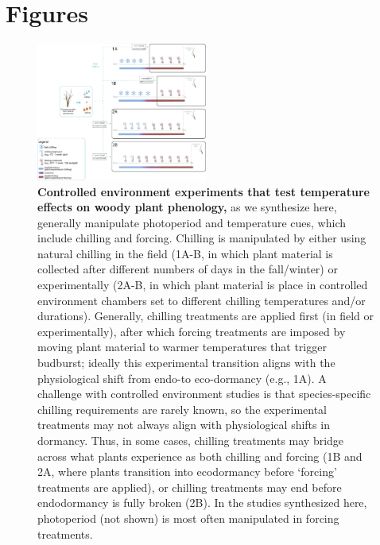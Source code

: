 \documentclass{article}
\begin{document}
\section* {Figures}
\begin{figure}[h!]
\centering
\noindent 
\includegraphics[width=0.5\textwidth]{figures/concept/Fig_bbconcept_dormant_V7.png}

\caption{\textbf{Controlled environment experiments that test temperature effects on woody plant phenology,} as we synthesize here, generally manipulate photoperiod and temperature cues, which include chilling and forcing. Chilling is manipulated by either using natural chilling in the field (1A-B, in which plant material is collected after different numbers of days in the fall/winter) or experimentally (2A-B, in which plant material is place in controlled environment chambers set to different chilling temperatures and/or durations). Generally, chilling treatments are applied first (in field or experimentally), after which forcing treatments are imposed by moving plant material to warmer temperatures that trigger budburst; ideally this experimental transition aligns with the physiological shift from endo-to eco-dormancy (e.g., 1A). A challenge with controlled environment studies is that species-specific chilling requirements are rarely known, so the experimental treatments may not always align with physiological shifts in dormancy. Thus, in some cases, chilling treatments may bridge across what plants experience as both chilling and forcing (1B and 2A, where plants transition into ecodormancy before `forcing' treatments are applied), or chilling treatments may end before endodormancy is fully broken (2B). In the studies synthesized here, photoperiod (not shown) is most often manipulated in forcing treatments.}
\label{fig:concept}  
\end{figure}
\end{document}
